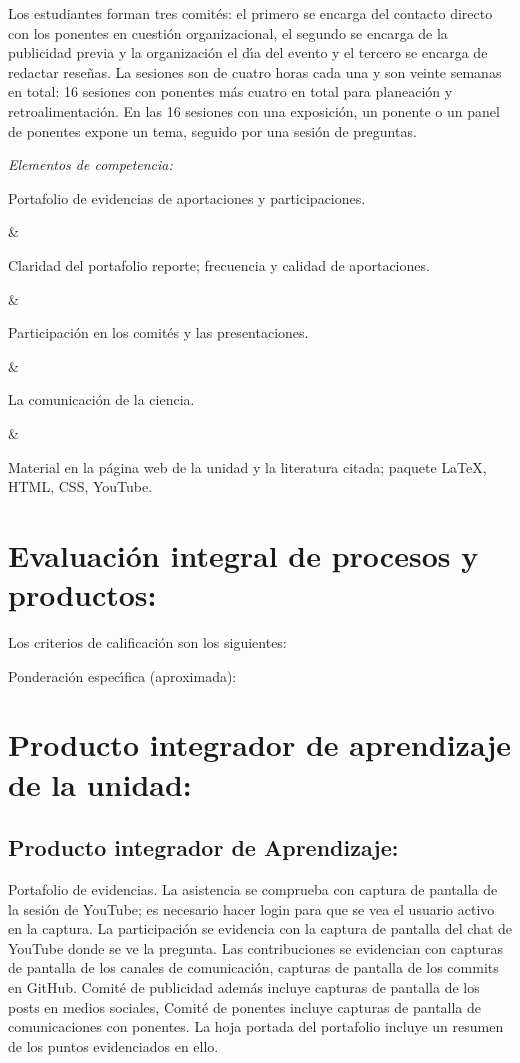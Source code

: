 \documentclass[10 pt]{article}
\begin{document}
Los estudiantes forman tres comit\'{e}s: el primero se encarga del
contacto directo con los ponentes en cuesti\'{o}n organizacional, el
segundo se encarga de la publicidad previa y la organizaci\'{o}n el d\'{\i}a
del evento y el tercero se encarga de redactar rese\~{n}as.  La sesiones
son de cuatro horas cada una y son veinte semanas en total: 16
sesiones con ponentes m\'{a}s cuatro en total para planeaci\'{o}n y
retroalimentaci\'{o}n. En las 16 sesiones con una exposici\'{o}n, un ponente o
un panel de ponentes expone un tema, seguido por una sesi\'{o}n de
preguntas.

{\em Elementos de competencia:}



Portafolio de evidencias de aportaciones y participaciones.

&

Claridad del portafolio reporte; frecuencia y calidad de aportaciones.

&

Participaci\'{o}n en los comit\'{e}s y las presentaciones.

&

La comunicaci\'{o}n de la ciencia.

&

Material en la p\'{a}gina web de la unidad y la literatura citada;
paquete {\LaTeX}, HTML, CSS, YouTube.



\section{Evaluaci\'{o}n integral de procesos y productos:}

Los criterios de calificaci\'{o}n son los siguientes:

  
Ponderaci\'{o}n espec\'{\i}fica (aproximada):



\newpage

\section{Producto integrador de aprendizaje de la unidad:}
\subsection{Producto integrador de Aprendizaje:} Portafolio de
evidencias.  La asistencia se comprueba con captura de pantalla de la
sesi\'{o}n de YouTube; es necesario hacer login para que se vea el
usuario activo en la captura. La participaci\'{o}n se evidencia con la
captura de pantalla del chat de YouTube donde se ve la pregunta. Las
contribuciones se evidencian con capturas de pantalla de los canales
de comunicaci\'{o}n, capturas de pantalla de los commits en
GitHub. Comit\'{e} de publicidad adem\'{a}s incluye capturas de
pantalla de los posts en medios sociales, Comit\'{e} de ponentes
incluye capturas de pantalla de comunicaciones con ponentes. La hoja
portada del portafolio incluye un resumen de los puntos evidenciados
en ello.
\end{document}
